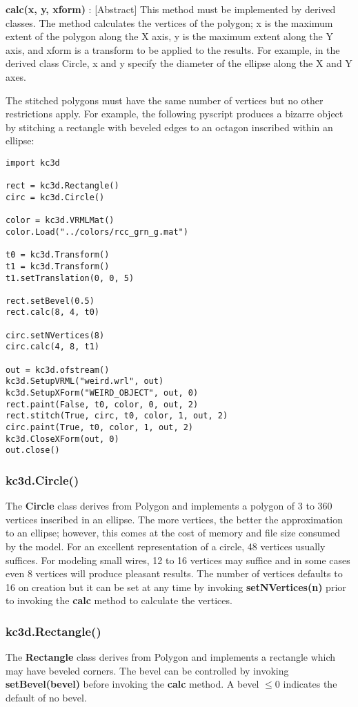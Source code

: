 \documentclass[a4paper, dvipdfm]{article}
\begin{document}
\textbf{calc(x, y, xform)} : [Abstract] This method must be implemented by derived
classes. The method calculates the vertices of the polygon; x is the
maximum extent of the polygon along the X axis, y is the maximum extent
along the Y axis, and xform is a transform to be applied to the results.
For example, in the derived class Circle, x and y specify the diameter
of the ellipse along the X and Y axes.

The stitched polygons must have the same number of vertices but no other restrictions
apply.  For example, the following pyscript produces a bizarre object by stitching a
rectangle with beveled edges to an octagon inscribed within an ellipse:

\begin{verbatim}
import kc3d

rect = kc3d.Rectangle()
circ = kc3d.Circle()

color = kc3d.VRMLMat()
color.Load("../colors/rcc_grn_g.mat")

t0 = kc3d.Transform()
t1 = kc3d.Transform()
t1.setTranslation(0, 0, 5)

rect.setBevel(0.5)
rect.calc(8, 4, t0)

circ.setNVertices(8)
circ.calc(4, 8, t1)

out = kc3d.ofstream()
kc3d.SetupVRML("weird.wrl", out)
kc3d.SetupXForm("WEIRD_OBJECT", out, 0)
rect.paint(False, t0, color, 0, out, 2)
rect.stitch(True, circ, t0, color, 1, out, 2)
circ.paint(True, t0, color, 1, out, 2)
kc3d.CloseXForm(out, 0)
out.close()
\end{verbatim}

\subsubsection{kc3d.Circle()}
\label{sec:kc3dCircle}
The \textbf{Circle} class derives from Polygon and implements a polygon of
3 to 360 vertices inscribed in an ellipse.  The more vertices, the better the approximation
to an ellipse; however, this comes at the cost of memory and file size consumed by the
model.  For an excellent representation of a circle, 48 vertices usually suffices. For
modeling small wires, 12 to 16 vertices may suffice and in some cases even 8 vertices
will produce pleasant results. The number of vertices defaults to 16 on creation
but it can be set at any time by invoking \textbf{setNVertices(n)} prior to invoking
the \textbf{calc} method to calculate the vertices.

\subsubsection{kc3d.Rectangle()}
The \textbf{Rectangle} class derives from Polygon and implements a rectangle which
may have beveled corners. The bevel can be controlled by invoking \textbf{setBevel(bevel)}
before invoking the \textbf{calc} method. A bevel $\le0$ indicates the default of no bevel.
\end{document}
